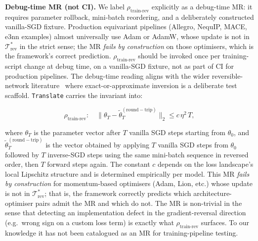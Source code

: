 \documentclass[acmsmall,screen,review]{acmart}
\begin{document}
\textbf{Debug-time MR (not CI).} We label $\rho_{\mathrm{train\text{-}rev}}$ explicitly as a debug-time MR: it requires parameter rollback, mini-batch reordering, and a deliberately constructed vanilla-SGD fixture. Production equivariant pipelines (Allegro, NequIP, MACE, e3nn examples) almost universally use Adam or AdamW, whose update is not in $\mathcal{T}^{*}_{\mathrm{rev}}$ in the strict sense; the MR \emph{fails by construction} on those optimisers, which is the framework's correct prediction. $\rho_{\mathrm{train\text{-}rev}}$ should be invoked once per training-script change at debug time, on a vanilla-SGD fixture, not as part of CI for production pipelines. The debug-time reading aligns with the wider reversible-network literature~\cite{Gomez2017Reversible} where exact-or-approximate inversion is a deliberate test scaffold. \texttt{Translate} carries the invariant into:

\begin{equation}
\rho_{\mathrm{train\text{-}rev}}: \quad \big\| \theta_T - \tilde\theta_T^{\mathrm{(round-trip)}} \big\|_2 \le c\,\eta^{2}\,T,
\end{equation}

\noindent where $\theta_T$ is the parameter vector after $T$ vanilla SGD steps starting from $\theta_0$, and $\tilde\theta_T^{\mathrm{(round-trip)}}$ is the vector obtained by applying $T$ vanilla SGD steps from $\theta_0$ followed by $T$ inverse-SGD steps using the same mini-batch sequence in reversed order, then $T$ forward steps again. The constant $c$ depends on the loss landscape's local Lipschitz structure and is determined empirically per model. This MR \emph{fails by construction} for momentum-based optimisers (Adam, Lion, etc.) whose update is not in $\mathcal{T}^{*}_{\mathrm{rev}}$; that is, the framework correctly predicts which architecture-optimiser pairs admit the MR and which do not. The MR is non-trivial in the sense that detecting an implementation defect in the gradient-reversal direction (e.g.\ wrong sign on a custom loss term) is exactly what $\rho_{\mathrm{train\text{-}rev}}$ surfaces. To our knowledge it has not been catalogued as an MR for training-pipeline testing.
\end{document}
